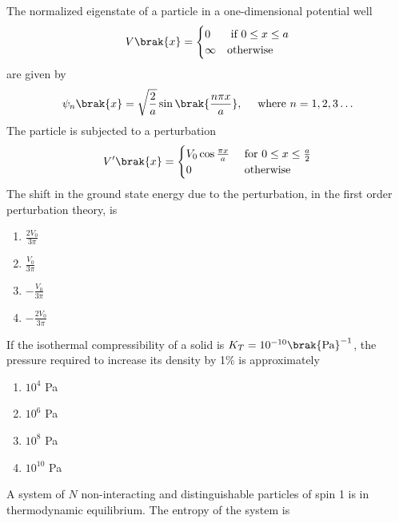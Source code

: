 \item The normalized eigenstate of a particle in a one-dimensional potential well
\begin{align*}
    V\brak{x}=
    \begin{cases}
    0 & \text{ if } 0 \le x \le a \\ \infty & \text{otherwise}
    \end{cases}
\end{align*}
are given by
\begin{align*}
    \psi_n\brak{x}=\sqrt{\frac{2}{a}}\sin\brak{\frac{n\pi x}{a}} , \quad \text{ where } n=1,2,3\dots
\end{align*}
The particle is subjected to a perturbation
\begin{align*}
V^\prime \brak{x}=
    \begin{cases}
    V_0\cos{\frac{\pi x}{a}} & \text{  for }0 \le x \le \frac{a}{2}
    \\ 0 & \text{\space otherwise}
    \end{cases}
\end{align*}
The shift in the ground state energy due to the perturbation, in the first order perturbation theory, is
\begin{multicols}{4}
    \begin{enumerate}
        \item $\frac{2V_0}{3\pi}$
        \item $\frac{V_0}{3\pi}$
        \item $-\frac{V_0}{3\pi}$
        \item $-\frac{2V_0}{3\pi}$
    \end{enumerate}
\end{multicols}
\item If the isothermal compressibility of a solid is $K_T = 10^{-10} \brak{\text{Pa}}^{-1}$, the pressure required to increase its density by 1\% is approximately
\begin{multicols}{4}
    \begin{enumerate}
        \item $10^4$ Pa
        \item $10^6$ Pa
        \item $10^8$ Pa
        \item $10^{10}$ Pa
    \end{enumerate}
\end{multicols}
\item A system of $N$ non-interacting and distinguishable particles of spin 1 is in thermodynamic equilibrium. The entropy of the system is
